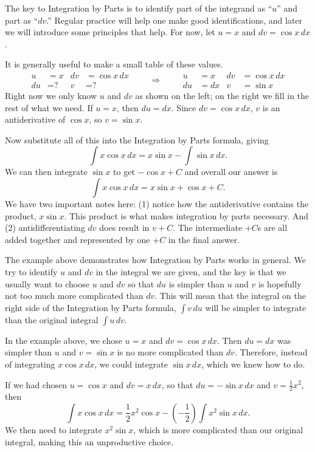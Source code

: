 {The key to Integration by Parts is to identify part of the integrand as ``$u$'' and part as ``$dv$.'' Regular practice will help one make good identifications, and later we will introduce some principles that help. For now, let  $u=x$ and $dv=\cos{x}\,dx$.

It is generally useful to make a small table of these values.
\[
\begin{aligned}
u&= x & dv&=\cos x\, dx\\
du&= \text{?} & v&=\text{?}
\end{aligned}
\qquad\Rightarrow\qquad
\begin{aligned}
u&= x & dv&=\cos x\, dx\\
du&= dx & v&=\sin x
\end{aligned}
\]
Right now we only know $u$ and $dv$ as shown on the left; on the right we fill in the rest of what we need. If $u = x$, then $du = dx$. Since $dv = \cos x\, dx$, $v$ is an antiderivative of $\cos x$, so $v = \sin x$.

Now substitute all of this into the Integration by Parts formula, giving
\[\int x\cos x\,dx = x\sin x - \int \sin x \,dx.\]
We can then integrate $\sin x$ to get $-\cos x + C$ and overall our answer is
\[\int x\cos x\, dx = x\sin x + \cos x + C.\]
We have two important notes here: (1) notice how the antiderivative contains the product, $x\sin x$. This product is what makes integration by parts necessary. And (2) antidifferentiating $dv$ does result in $v+C$. The intermediate $+C$s are all added together and represented by one $+C$ in the final answer.}

The example above demonstrates how Integration by Parts works in general.  We try to identify $u$ and $dv$ in the integral we are given, and the key is that we usually want to choose $u$ and $dv$ so that $du$ is simpler than $u$ and $v$ is hopefully not too much more complicated than $dv$.  This will mean that the integral on the right side of the Integration by Parts formula, $\int v\,du$ will be simpler to integrate than the original integral $\int u\,dv$.

In the example above, we chose $u=x$ and $dv=\cos x\,dx$.  Then $du=dx$ was simpler than $u$ and $v=\sin x$ is no more complicated than $dv$.  Therefore, instead of integrating $x\cos x \,dx$, we could integrate $\sin x\,dx$, which we knew how to do.

If we had chosen $u=\cos x$ and $dv=x\, dx$, so that $du=-\sin x\,dx$ and $v=\frac12x^2$, then
\[\int x\cos x\, dx=\frac12x^2\cos x-\left(-\frac12\right)\int x^2\sin x\, dx.\]
We then need to integrate $x^2\sin x$, which is more complicated than our original integral, making this an unproductive choice.

